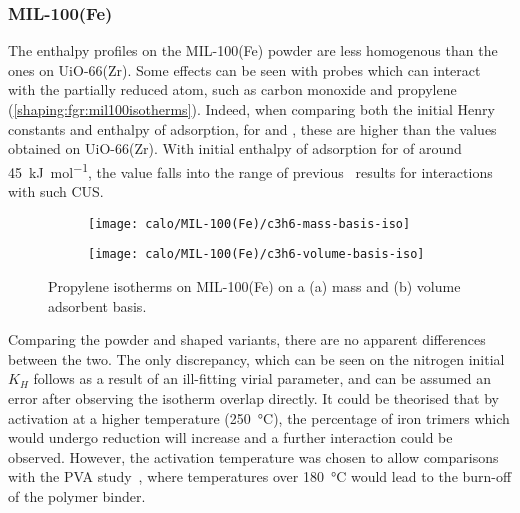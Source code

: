 
\subsubsection{MIL-100(Fe)}

The enthalpy profiles on the MIL-100(Fe) powder are less homogenous
than the ones on UiO-66(Zr). Some effects can be seen with probes which
can interact with the partially reduced  atom, such as
carbon monoxide and propylene (\autoref{shaping:fgr:mil100isotherms}).
Indeed, when comparing both the initial Henry constants and
enthalpy of adsorption, for  and , these are
higher than the values obtained on UiO-66(Zr).
With initial enthalpy of adsorption for  of around
\SI{45}{\kilo\joule\per\mol}, the value falls into the range of
previous~\cite{yoonControlledReducibilityMetalOrganic2010}
results for interactions with such  CUS.

\begin{figure}[htb]
	\centering
	\begin{subfigure}{0.45\textwidth}
		\texttt{[image: calo/MIL-100(Fe)/c3h6-mass-basis-iso]}
		\caption{}%
		\label{shaping:fgr:mil100c3h6adsmol}
	\end{subfigure}
	\begin{subfigure}{0.45\textwidth}
		\texttt{[image: calo/MIL-100(Fe)/c3h6-volume-basis-iso]}
		\caption{}%
		\label{shaping:fgr:mil100c3h6adsvol}
	\end{subfigure}%
	\caption{Propylene isotherms on MIL-100(Fe) on a (a) mass
		and (b) volume adsorbent basis.}%
	\label{shaping:fgr:mil100isotherms}
\end{figure}

Comparing the powder and shaped variants, there are no
apparent differences between the two. The only discrepancy,
which can be seen on the nitrogen initial \(K_H\) follows
as a result of an ill-fitting virial parameter,
and can be assumed an error after observing the isotherm
overlap directly. It could be theorised that by activation at
a higher temperature (\SI{250}{\degreeCelsius}),
the percentage of iron trimers which would undergo reduction will
increase and a further interaction could be observed.
However, the activation temperature was chosen to allow
comparisons with the PVA study~\cite{chanutObservingEffectsShaping2016},
where temperatures over \SI{180}{\degreeCelsius} would lead to the
burn-off of the polymer binder.

